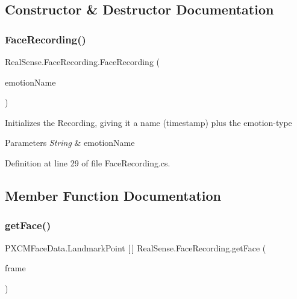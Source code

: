\subsection{Constructor \& Destructor Documentation}
\mbox{\label{class_real_sense_1_1_face_recording_a06fe1ad41d77cd359dd583c70d1f6e35}} 
\subsubsection{\texorpdfstring{Face\+Recording()}{FaceRecording()}}
{\footnotesize\ttfamily Real\+Sense.\+Face\+Recording.\+Face\+Recording (\begin{DoxyParamCaption}\item[{String}]{emotion\+Name }\end{DoxyParamCaption})}

Initializes the Recording, giving it a name (timestamp) plus the emotion-\/type 
\begin{DoxyParams}{Parameters}
{\em String} & emotion\+Name \\
\hline
\end{DoxyParams}


Definition at line 29 of file Face\+Recording.\+cs.



\subsection{Member Function Documentation}
\mbox{\label{class_real_sense_1_1_face_recording_a8a5e0b5187f8f71e490c612289df757f}} 
\subsubsection{\texorpdfstring{get\+Face()}{getFace()}}
{\footnotesize\ttfamily P\+X\+C\+M\+Face\+Data.\+Landmark\+Point \mbox{[}$\,$\mbox{]} Real\+Sense.\+Face\+Recording.\+get\+Face (\begin{DoxyParamCaption}\item[{int}]{frame }\end{DoxyParamCaption})}

